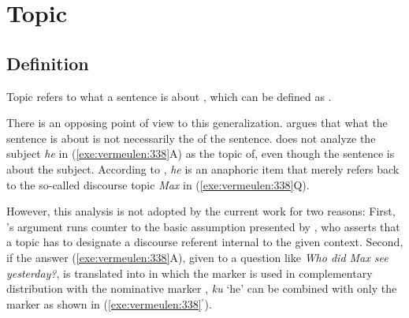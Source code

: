 \section{Topic}
\label{3:sec:topic}


\subsection{Definition}
\label{3:ssec:definition-topic}


Topic refers to what a sentence is about
\citep{strawson:64,lambrecht:96,choi:99}, which can be defined as
.


There is an opposing point of view to this generalization.
\citet{vermeulen:09} argues that what the sentence is about is not
necessarily the  of the sentence.  \citeauthor{vermeulen:09} does
not analyze the subject \textit{he} in (\ref{exe:vermeulen:338}A) as
the topic of, even though the sentence is about the subject.
According to \citeauthor{vermeulen:09}, \textit{he} is an anaphoric
item that merely refers back to the so-called discourse topic
\textit{Max} in (\ref{exe:vermeulen:338}Q).




\noindent However, this analysis is not adopted by the current work
for two reasons: First, \citeauthor{vermeulen:09}'s argument runs
counter to the basic assumption presented by \citet{lambrecht:96}, who
asserts that a topic has to designate a discourse referent internal to
the given context. Second, if the answer (\ref{exe:vermeulen:338}A),
given to a question like \textit{Who did Max see yesterday?}, is
translated into  in which the \nun marker is used in
complementary distribution with the nominative marker \ika,
\textit{ku} `he' can be combined with only the \nun marker as shown in
(\ref{exe:vermeulen:338}$^\ensuremath{\prime}$).

